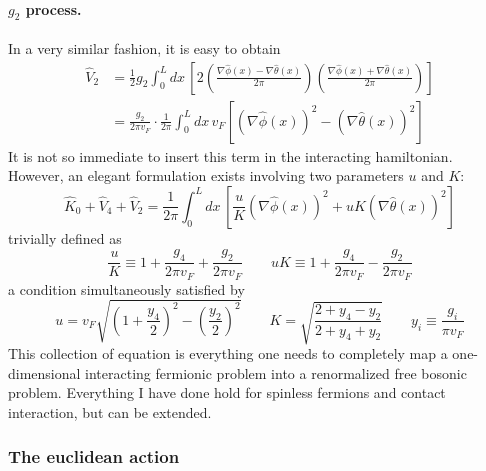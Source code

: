 \paragraph{$g_2$ process.} In a very similar fashion, it is easy to obtain
\[
\begin{aligned}
	\hat V_2 &= \frac{1}{2} g_2 \int_0^L dx \, \left[ 2 \left( \frac{\nabla \hat \phi(x) - \nabla \hat \theta(x)}{2\pi} \right) \left( \frac{\nabla \hat \phi(x) + \nabla \hat \theta(x)}{2\pi} \right) \right] \\
	&= \frac{g_2}{2\pi v_F} \cdot \frac{1}{2\pi} \int_0^L dx \, v_F \left[ \left( \nabla \hat \phi(x) \right)^2 - \left( \nabla \hat \theta(x) \right)^2 \right]
\end{aligned}
\]
It is not so immediate to insert this term in the interacting hamiltonian. However, an elegant formulation exists involving two parameters $u$ and $K$:
\begin{equation}\label{eq:interacting-fields-hamiltonian}
	\hat K_0 + \hat V_4 + \hat V_2 = \frac{1}{2\pi} \int_0^L dx \, \left[ \frac{u}{K} \left( \nabla \hat \phi(x) \right)^2 + uK \left( \nabla \hat \theta(x) \right)^2 \right]
\end{equation}
trivially defined as
\[
	\frac{u}{K} \equiv 1 + \frac{g_4}{2\pi v_F} + \frac{g_2}{2\pi v_F}
	\qquad
	uK \equiv 1 + \frac{g_4}{2\pi v_F} - \frac{g_2}{2\pi v_F}
\]
a condition simultaneously satisfied by
\[
	u = v_F \sqrt{\left(1 + \frac{y_4}{2}\right)^2 - \left(\frac{y_2}{2}\right)^2}
	\qquad
	K = \sqrt{\frac{2 + y_4 - y_2}{2 + y_4 + y_2}}
	\qquad
	y_i \equiv \frac{g_i}{\pi v_F}
\]
This collection of equation is everything one needs to completely map a one-dimensional interacting fermionic problem into a renormalized free bosonic problem. Everything I have done hold for spinless fermions and contact interaction, but can be extended.

\subsubsection{The euclidean action}

